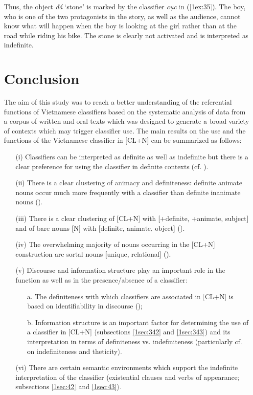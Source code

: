 \documentclass[output=paper]{langsci/langscibook}
\begin{document}
{
Thus, the object {\emph{đá}} `stone' is marked by the classifier {\emph{cục}} in (\ref{1ex:35}). The boy, who is one of the two protagonists in the story, as well as the audience, cannot know what will happen when the boy is looking at the girl rather than at the road while riding his bike. The stone is clearly not activated and is interpreted as indefinite. 
}

\section{Conclusion}\label{1sec:5}
The aim of this study was to reach a better understanding of the referential functions of Vietnamese classifiers based on the systematic analysis of data from a corpus of written and oral texts which was designed to generate a broad variety of contexts which may trigger classifier use. The main results on the use and the functions of the Vietnamese classifier in [CL+N] can be summarized as follows:

\begin{itemize}
\item[(i)] 
{
Classifiers can be interpreted as definite as well as indefinite but there is a clear preference for using the classifier in definite contexts (cf. ).
}
%
\item[(ii)] There is a clear clustering of animacy and definiteness: definite animate nouns occur much more frequently with a classifier than definite inanimate nouns ().
%
\item[(iii)] There is a clear clustering of [CL+N] with [+definite, +animate, subject] and of bare nouns [N] with [\minus definite, \minus animate, object] ().
%
\item[(iv)] The overwhelming majority of nouns occurring in the [CL+N] construction are sortal nouns [\minus unique, \minus relational] ().
%


\item[(v)] Discourse and information structure play an important role in the function as well as in the presence/absence of a classifier:
%
	\begin{itemize}
	\item[a.] The definiteness with which classifiers are associated in [CL+N] is based on identifiability in discourse ();
	\item[b.] Information structure is an important factor for determining the use of a classifier in [CL+N] (subsections \ref{1sec:342} and \ref{1sec:343}) and its interpretation in terms of definiteness vs. indefiniteness (particularly cf.  on indefiniteness and theticity).
	\end{itemize}
%	
\item[(vi)]	There are certain semantic environments which support the indefinite interpretation of the classifier (existential clauses and verbs of appearance; subsections \ref{1sec:42} and \ref{1sec:43}).
\end{itemize}
\end{document}
